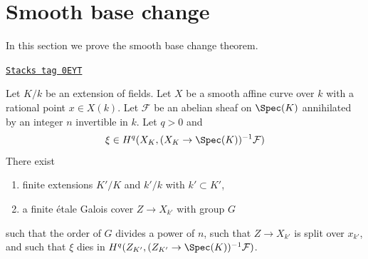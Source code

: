 \section{Smooth base change}
\label{etale-cohomology-section-smooth-base-change}
In this section we prove the smooth base change theorem.

\begin{lemma}
\label{etale-cohomology-lemma-smooth-base-change-fields}
\href{https://stacks.math.columbia.edu/tag/0EYT}{\texttt{Stacks tag 0EYT}}

Let $K/k$ be an extension of fields. Let $X$ be a smooth affine curve
over $k$ with a rational point $x \in X(k)$. Let $\mathcal{F}$ be an abelian
sheaf on $\Spec(K)$ annihilated by an integer $n$ invertible in $k$.
Let $q > 0$ and
$$
\xi \in H^q(X_K, (X_K \to \Spec(K))^{-1}\mathcal{F})
$$
There exist
\begin{enumerate}
\item finite extensions $K'/K$ and $k'/k$ with $k' \subset K'$,
\item a finite \'etale Galois cover $Z \to X_{k'}$ with group $G$
\end{enumerate}
such that the order of $G$ divides a power of $n$, such that
$Z \to X_{k'}$ is split over $x_{k'}$, and
such that $\xi$ dies in $H^q(Z_{K'}, (Z_{K'} \to \Spec(K))^{-1}\mathcal{F})$.
\end{lemma}

